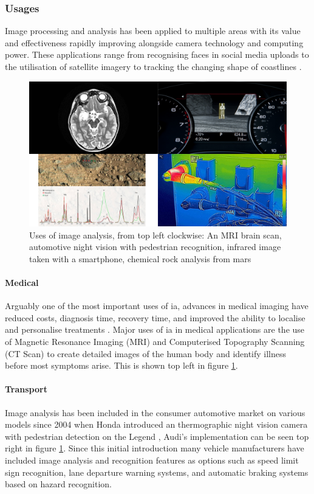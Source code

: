 	\subsubsection{Usages}
	Image processing and analysis has been applied to multiple areas with its value and 
	effectiveness rapidly improving alongside camera technology and computing power. These 
	applications range from recognising faces in social media uploads \citep{zuckerberg2011tagging} 
	to the utilisation of satellite imagery to tracking the changing shape of coastlines 
	\citep{costalimagery}.
	\begin{figure}[h!]
		\centering
		\includegraphics[width=15cm]{../images/4panel.png}
		\caption[Uses of image analysis]{Uses of image analysis, from top left clockwise: An MRI brain scan, automotive 
		night vision with pedestrian recognition, infrared image taken with a smartphone, chemical 
		rock analysis from 
			mars}
		\label{fig:analysis_uses}
	\end{figure}
	\paragraph{Medical}
	Arguably one of the most important uses of \gls{ia}, advances in medical imaging have reduced costs, diagnosis time, recovery time, and improved the ability to localise and personalise treatments \citep{esfmedical}. Major uses of \gls{ia} in medical applications are the use of Magnetic Resonance Imaging (MRI) and Computerised Topography Scanning (CT Scan) to create detailed images of the human body and identify illness before most symptoms arise. This is shown top left in figure \ref{fig:analysis_uses}.
	\paragraph{Transport}
	Image analysis has been included in the consumer automotive market on various models since 2004 when Honda introduced an thermographic night vision camera with pedestrian detection on the Legend  \citep{hondanightvision}, Audi's implementation can be seen top right in figure \ref{fig:analysis_uses}. Since this initial introduction many vehicle manufacturers have included image analysis and recognition features as options such as speed limit sign recognition, lane departure warning systems, and automatic braking systems based on hazard recognition.
